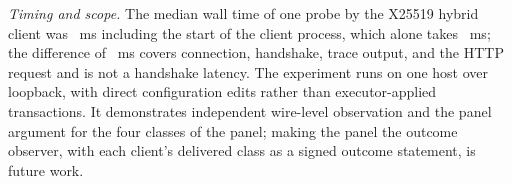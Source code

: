 \emph{Timing and scope.} The median wall time of one probe by the X25519 hybrid client was \TlsProbeMs~ms including the start of the client process, which alone takes \TlsBaselineMs~ms; the difference of \TlsProbeNetMs~ms covers connection, handshake, trace output, and the HTTP request and is not a handshake latency. The experiment runs on one host over loopback, with direct configuration edits rather than executor-applied transactions. It demonstrates independent wire-level observation and the panel argument for the four classes of the panel; making the panel the outcome observer, with each client's delivered class as a signed outcome statement, is future work.
